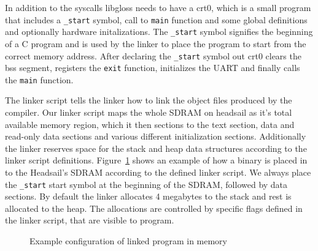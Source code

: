 \documentclass[12pt,a4paper,english
]{tunithesis}
\begin{document}
In addition to the syscalls libgloss needs to have a crt0, which is a small program that includes a \texttt{\_start} symbol, call to \texttt{main} function and some global definitions and optionally hardware initalizations. The \texttt{\_start} symbol signifies the beginning of a C program and is used by the linker to place the program to start from the correct memory address. After declaring the \texttt{\_start} symbol out crt0 clears the bss segment, registers the \texttt{exit} function, initializes the UART and finally calls the \texttt{main} function.

The linker script tells the linker how to link the object files produced by the compiler. Our linker script maps the whole SDRAM on headsail as it's total available memory region, which it then sections to the text section, data and read-only data sections and various different initialization sections. Additionally the linker reserves space for the stack and heap data structures according to the linker script definitions. Figure~\ref{fig:sdram-memory-layout} shows an example of how a binary is placed in to the Headsail's SDRAM according to the defined linker script. We always place the \texttt{\_start} start symbol at the beginning of the SDRAM, followed by data sections. By default the linker allocates 4 megabytes to the stack and rest is allocated to the heap.
The allocations are controlled by specific flags defined in the linker script, that are visible to program.

\begin{figure}
  \centering
{}
\caption{Example configuration of linked program in memory}
\label{fig:sdram-memory-layout}
\end{figure}
\end{document}
